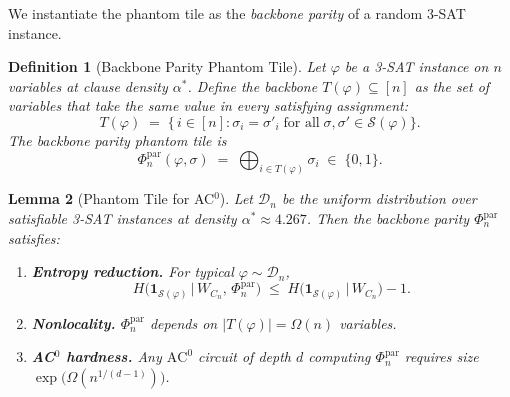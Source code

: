 \documentclass[11pt]{article}
\newtheorem{lemma}{Lemma}
\newtheorem{definition}[lemma]{Definition}
\theoremstyle{definition}
\begin{document}
We instantiate the phantom tile as the \emph{backbone parity} of a random 3-SAT instance.

\begin{definition}[Backbone Parity Phantom Tile]
\label{def:backbone-parity}
Let $\varphi$ be a 3-SAT instance on $n$ variables at clause density $\alpha^*$.
Define the \emph{backbone} $T(\varphi) \subseteq [n]$ as the set of variables that take
the same value in every satisfying assignment:
\[
  T(\varphi) \;=\; \bigl\{\, i \in [n] : \sigma_i = \sigma'_i
    \;\text{for all}\; \sigma, \sigma' \in \mathcal{S}(\varphi) \bigr\}.
\]
The \emph{backbone parity phantom tile} is
\[
  \Phi_n^{\mathrm{par}}(\varphi, \sigma)
  \;=\;
  \bigoplus_{i \in T(\varphi)} \sigma_i
  \;\in\; \{0,1\}.
\]
\end{definition}

\begin{lemma}[Phantom Tile for AC$^0$]
\label{lem:PT-AC0}
Let $\mathcal{D}_n$ be the uniform distribution over satisfiable 3-SAT instances at density
$\alpha^* \approx 4.267$.  Then the backbone parity $\Phi_n^{\mathrm{par}}$ satisfies:
\begin{enumerate}
  \item[\textup{(a)}] \textbf{Entropy reduction.}
    For typical $\varphi \sim \mathcal{D}_n$,
    \[
      H\bigl(\mathbf{1}_{\mathcal{S}(\varphi)} \,\big|\, W_{C_n},\, \Phi_n^{\mathrm{par}}\bigr)
      \;\leq\;
      H\bigl(\mathbf{1}_{\mathcal{S}(\varphi)} \,\big|\, W_{C_n}\bigr) - 1.
    \]
  \item[\textup{(b)}] \textbf{Nonlocality.}
    $\Phi_n^{\mathrm{par}}$ depends on $|T(\varphi)| = \Omega(n)$ variables.
  \item[\textup{(c)}] \textbf{AC$^0$ hardness.}
    Any $\mathrm{AC}^0$ circuit of depth $d$ computing
    $\Phi_n^{\mathrm{par}}$ requires size $\exp\!\bigl(\Omega(n^{1/(d-1)})\bigr)$.
\end{enumerate}
\end{lemma}
\end{document}
